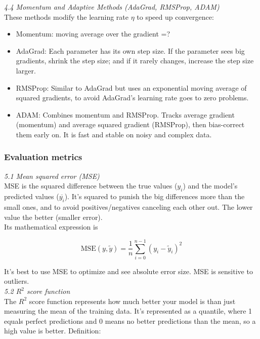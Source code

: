 \documentclass[amssymb,twocolumn,aps]{revtex4-2}
\begin{document}
\textit{4.4 Momentum and Adaptive Methods (AdaGrad, RMSProp, ADAM) } \\

These methods modify the learning rate $\eta$ to speed up convergence: 

\begin{itemize}
    \item Momentum: moving average over the gradient =?
    \item AdaGrad: Each parameter has its own step size. If the parameter sees big gradients, shrink the step size; and if it rarely changes, increase the step size larger. 
    \item RMSProp: Similar to AdaGrad but uses an exponential moving average of squared gradients, to avoid AdaGrad's learning rate goes to zero problems. 
    \item ADAM: Combines momentum and RMSProp. Tracks average gradient (momentum) and average squared gradient (RMSProp), then bias-correct them early on. It is fast and stable on noisy and complex data. 
\end{itemize}

\subsubsection{Evaluation metrics}

\textit{5.1 Mean squared error (MSE)} \\

MSE is the squared difference between the true values ($y_i$) and the model's predicted values ($\overline{y_i}$). It's squared to punish the big differences more than the small ones, and to avoid positives/negatives canceling each other out. The lower value the better (smaller error). \\

Its mathematical expression is 

\begin{equation}
    \text{MSE}(y, \tilde{y}) = \frac{1}{n} \sum_{i=0}^{n-1} (y_i - \tilde{y}_i)^2 
\end{equation}

It's best to use MSE to optimize and see absolute error size. MSE is sensitive to outliers. \\

\textit{5.2 $R^2$ score function} \\

The $R^2$ score function represents how much better your model is than just measuring the mean of the training data. It's represented as a quantile, where 1 equals perfect predictions and 0 means no better predictions than the mean, so a high value is better. Definition: 
\end{document}
